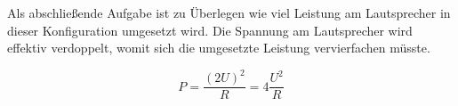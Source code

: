 Als abschließende Aufgabe ist zu Überlegen wie viel Leistung am Lautsprecher in dieser Konfiguration umgesetzt wird. Die Spannung am Lautsprecher wird effektiv verdoppelt, womit sich die umgesetzte Leistung vervierfachen müsste. 

\begin{equation*}
    P = \frac{(2 U)^2}{R} = 4 \frac{U^2}{R}
\end{equation*}
